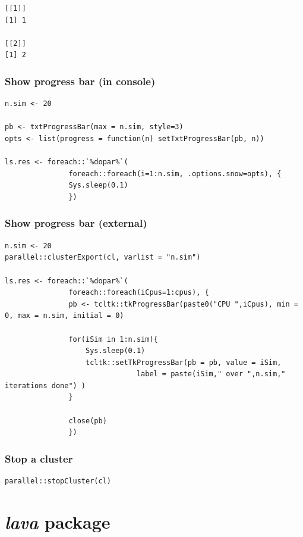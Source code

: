 \documentclass{article}
\begin{document}
\begin{verbatim}
[[1]]
[1] 1

[[2]]
[1] 2
\end{verbatim}

\subsubsection{Show progress bar (in console)}
\label{sec:org612a27e}

\lstset{language=r,label= ,caption= ,captionpos=b,numbers=none}
\begin{lstlisting}
n.sim <- 20

pb <- txtProgressBar(max = n.sim, style=3)
opts <- list(progress = function(n) setTxtProgressBar(pb, n))

ls.res <- foreach::`%dopar%`(
		       foreach::foreach(i=1:n.sim, .options.snow=opts), {
			   Sys.sleep(0.1)
		       })
\end{lstlisting}

\subsubsection{Show progress bar (external)}
\label{sec:org98210a1}

\lstset{language=r,label= ,caption= ,captionpos=b,numbers=none}
\begin{lstlisting}
n.sim <- 20
parallel::clusterExport(cl, varlist = "n.sim")

ls.res <- foreach::`%dopar%`(
		       foreach::foreach(iCpus=1:cpus), {
			   pb <- tcltk::tkProgressBar(paste0("CPU ",iCpus), min = 0, max = n.sim, initial = 0)

			   for(iSim in 1:n.sim){
			       Sys.sleep(0.1)
			       tcltk::setTkProgressBar(pb = pb, value = iSim,
						       label = paste(iSim," over ",n.sim," iterations done") )
			   }

			   close(pb)
		       })
\end{lstlisting}

\subsubsection{Stop a cluster}
\label{sec:org0010177}

\lstset{language=r,label= ,caption= ,captionpos=b,numbers=none}
\begin{lstlisting}
parallel::stopCluster(cl)
\end{lstlisting}

\section{\emph{lava} package}
\label{sec:orgba78138}
\end{document}
